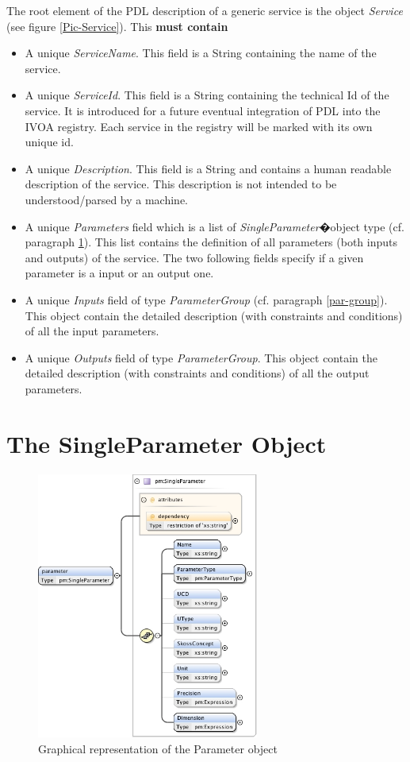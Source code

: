 \documentclass[a4paper,11pt] {article}
\begin{document}
The root element of the PDL description of a generic service is the object {\it Service} (see figure
\ref{Pic-Service}). This {\bf must contain}
\begin{itemize}
\item A unique {\it ServiceName}. This field is a String containing the name of the service.
\item A unique {\it ServiceId}. This field is a String containing the technical Id of the service.
It is introduced for a future eventual integration of PDL into the IVOA registry. Each service in
the registry will be marked with its own unique id.
\item A unique {\it Description}. This field is a String and contains a human readable description
of the service. This description is not intended to be understood/parsed by a machine.
\item A unique {\it Parameters} field which is a list of {\it SingleParameter}�object type (cf.
paragraph \ref{par01}). This list contains the definition of all parameters (both inputs and
outputs) of the service. The two following fields specify if a given parameter is a input or an
output one.
\item A unique {\it Inputs} field of type {\it ParameterGroup} (cf. paragraph \ref{par-group}). This
object contain the detailed description (with constraints and conditions) of all the input
parameters.
\item A unique {\it Outputs} field of type {\it ParameterGroup}. This object contain the detailed
description (with constraints and conditions) of all the output parameters.
\end{itemize}


\section{The SingleParameter Object}\label{par01}

\begin{figure}[htbp]
\begin{center}
\includegraphics[width=0.65\textwidth]{pictures/Parameter.jpg} 
\caption{Graphical representation of the Parameter object}
\label{Pic-Parameter}
\end{center}
\end{figure}
\end{document}
